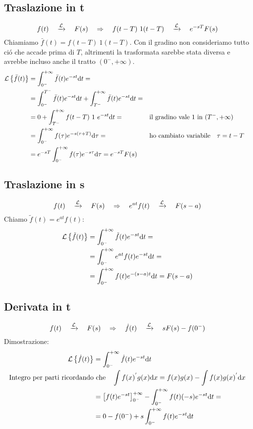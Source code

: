 \documentclass[../main.tex]{subfiles}
\begin{document}
	\subsection{Traslazione in t}
	\label{trasl_t}
	$$ f(t) \quad \xrightarrow{\mathcal{L}} \quad F(s) \quad \Rightarrow \quad f(t-T)\ 1(t-T) \quad \xrightarrow{\mathcal{L}} \quad e^{-sT}F(s) $$
	\linebreak
	Chiamiamo $ \bar{f}(t) = f(t-T)\ 1(t-T) $. Con il gradino non consideriamo tutto ci\'{o} che accade prima di $T$, altrimenti la trasformata sarebbe stata diversa e avrebbe incluso anche il tratto $(0^{-},+ \infty)$.
	\begin{align*}
		\mathcal{L} \left\lbrace \bar{f}(t) \right\rbrace &= \int_{0^{-}}^{+\infty} \bar{f}(t) e^{- s t} \mathrm{d} t =\\
		&= \int_{0^{-}}^{T^{-}} \bar{f}(t) e^{-st} \mathrm{d}t + \int_{T^{-}}^{+ \infty} \bar{f}(t) e^{-st} \mathrm{d}t =\\
		&= 0+ \int_{T^{-}}^{+ \infty} f(t-T)\ 1\ e^{-st} \mathrm{d}t=
		\qquad &&\text{il gradino vale 1 in } (T^{-},+ \infty) \\
		&= \int_{0^{-}}^{+ \infty} f(\tau) e^{-s(\tau+T)} \mathrm{d}\tau = \qquad &&\text{ho cambiato variabile} \quad \tau=t-T\\
		&= e^{-sT} \int_{0^{-}}^{+\infty} f(\tau) e^{- s \tau} \mathrm{d} \tau = e^{-sT} F(s)
	\end{align*}
	\subsection{Traslazione in s}
	\label{trasl_s}
	$$ f(t) \quad \xrightarrow{\mathcal{L}} \quad F(s) \quad \Rightarrow \quad e^{at}f(t) \quad \xrightarrow{\mathcal{L}} \quad F(s-a)$$
	Chiamo $\tilde{f}(t) = e^{at} f(t) $:\\
	\begin{align*}
		\mathcal{L} \left\lbrace \tilde{f}(t) \right\rbrace &= \int_{0^{-}}^{+\infty} \tilde{f}(t) e^{- s t} \mathrm{d} t =\\
		&= \int_{0^{-}}^{+\infty} e^{at}f(t) e^{- s t} \mathrm{d} t = \\
		&= \int_{0^{-}}^{+ \infty} f(t) e^{-(s-a)t} \mathrm{d}t = F(s-a)
	\end{align*}
	\subsection{Derivata in t}
	\label{deriv_t}
	$$ f(t) \quad \xrightarrow{\mathcal{L}} \quad F(s) \quad \Rightarrow \quad \dot{f}(t) \quad \xrightarrow{\mathcal{L}} \quad sF(s)-f(0^{-}) $$
	Dimostrazione:
	\begin{align*}
		\mathcal{L} \left\lbrace \dot{f}(t) \right\rbrace &= \int_{0^{-}}^{+\infty} \dot{f}(t) e^{- s t} \mathrm{d} t\\
		\text{Integro per parti ricordando} &\text{ che} \quad \int f(x)^{'}g(x)\mathrm{d}x = f(x)g(x) - \int f(x)g(x)^{'} \mathrm{d}x\\
		&= \left[ f(t)e^{-st} \right]_{0^{-}}^{+\infty} - \int_{0^{-}}^{+\infty} f(t)(-s) e^{- s t} \mathrm{d} t =\\
		&= 0 - f(0^{-}) + s \int_{0^{-}}^{+\infty} f(t) e^{- s t} \mathrm{d} t 
	\end{align*}
\end{document}
